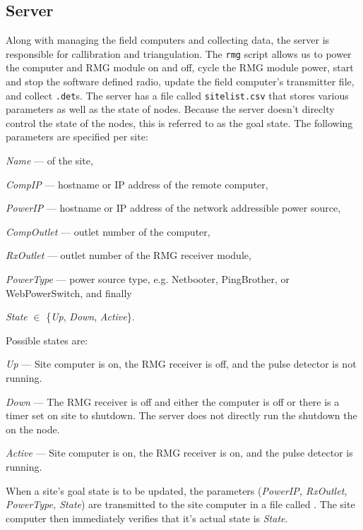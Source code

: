 \documentclass[letter]{article}
\begin{document}
\subsection{Server} 
Along with managing the field computers and collecting data, the server is responsible for
callibration and triangulation. The \texttt{rmg} script allows us to power the computer and 
RMG module on and off, cycle the RMG module power, start and stop the software defined radio, 
update the field computer's transmitter file, and collect \texttt{.det}s. The server has a 
file called \texttt{sitelist.csv} that stores various parameters as well as the state of 
nodes. Because the server doesn't direclty control the state of the nodes, this is referred to
as the goal state. The following parameters are specified per site: 
\begin{description}
  \item \textit{Name} --- of the site, 
  \item \textit{CompIP} --- hostname or IP address of the remote computer, 
  \item \textit{PowerIP} --- hostname or IP address of the network addressible power source,
  \item \textit{CompOutlet} --- outlet number of the computer, 
  \item \textit{RxOutlet} --- outlet number of the RMG receiver module, 
  \item \textit{PowerType} --- power source type, e.g. Netbooter, PingBrother, or WebPowerSwitch, and finally
  \item \textit{State} $\in$ \{\textit{Up}, \textit{Down}, \textit{Active}\}.
\end{description}
Possible states are: 
\begin{description}
  \item \textit{Up} --- Site computer is on, the RMG receiver is off, and the pulse detector 
    is not running. 
  \item \textit{Down} --- The RMG receiver is off and either the computer is off or there 
    is a timer set on site to shutdown. The server does not directly run the shutdown the 
    on the node. 
  \item \textit{Active} --- Site computer is on, the RMG receiver is on, and the pulse detector is
    running. 
\end{description}

When a site's goal state is to be updated, the parameters (\textit{PowerIP, RxOutlet, PowerType, State})
are transmitted to the site computer in a file called . The site computer then immediately
verifies that it's actual state is \textit{State}. 
\end{document}
